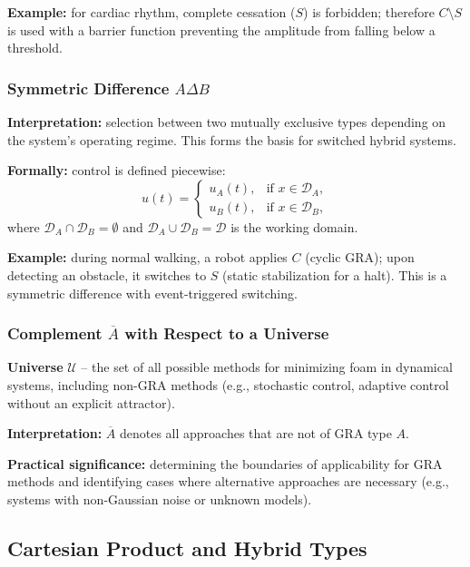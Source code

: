 \documentclass[12pt,a4paper]{article}
\newcommand{\U}{\mathcal{U}}
\begin{document}
\textbf{Example:} for cardiac rhythm, complete cessation ($S$) is forbidden; therefore $C \setminus S$ is used with a barrier function preventing the amplitude from falling below a threshold.

\subsubsection{Symmetric Difference $A \Delta B$}

\textbf{Interpretation:} selection between two mutually exclusive types depending on the system's operating regime. This forms the basis for switched hybrid systems.

\textbf{Formally:} control is defined piecewise:
\begin{equation}
    u(t) = \begin{cases}
        u_A(t), & \text{if } x \in \mathcal{D}_A, \\
        u_B(t), & \text{if } x \in \mathcal{D}_B,
    \end{cases}
\end{equation}
where $\mathcal{D}_A \cap \mathcal{D}_B = \emptyset$ and $\mathcal{D}_A \cup \mathcal{D}_B = \mathcal{D}$ is the working domain.

\textbf{Example:} during normal walking, a robot applies $C$ (cyclic GRA); upon detecting an obstacle, it switches to $S$ (static stabilization for a halt). This is a symmetric difference with event-triggered switching.

\subsubsection{Complement $\overline{A}$ with Respect to a Universe}

\textbf{Universe} $\U$ – the set of all possible methods for minimizing foam in dynamical systems, including non-GRA methods (e.g., stochastic control, adaptive control without an explicit attractor).

\textbf{Interpretation:} $\overline{A}$ denotes all approaches that are not of GRA type $A$.

\textbf{Practical significance:} determining the boundaries of applicability for GRA methods and identifying cases where alternative approaches are necessary (e.g., systems with non-Gaussian noise or unknown models).

\subsection{Cartesian Product and Hybrid Types}
\end{document}

